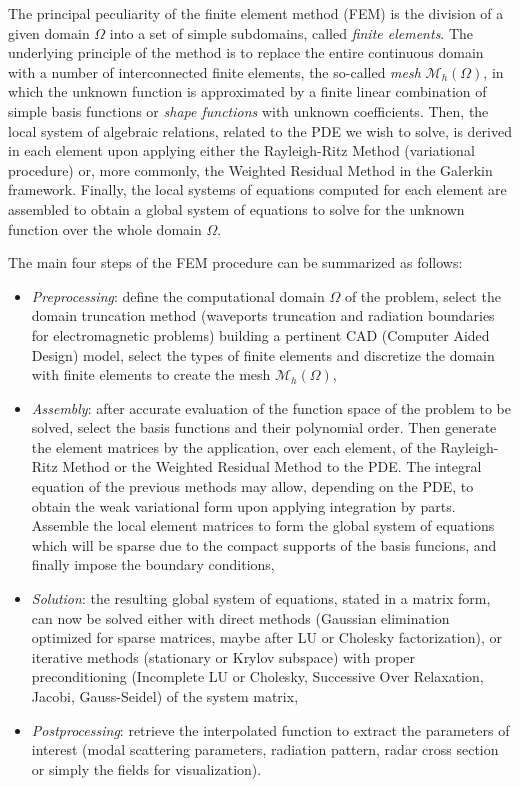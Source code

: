 The principal peculiarity of the finite element method (FEM) is the division of a given domain $\Omega$ into a set of simple subdomains, called \textit{finite elements}. The underlying principle of the method is to replace the entire continuous domain with a number of interconnected finite elements, the so-called \textit{mesh} $\mathcal{M}_h(\Omega)$, in which the unknown function is approximated by a finite linear combination of simple basis functions or \textit{shape functions} with unknown coefficients. Then, the local system of algebraic relations, related to the PDE we wish to solve, is derived in each element upon applying either the Rayleigh-Ritz Method (variational procedure) or, more commonly, the Weighted Residual Method in the Galerkin framework. Finally, the local systems of equations computed for each element are assembled to obtain a global system of equations to solve for the unknown function over the whole domain $\Omega$. 

The main four steps of the FEM procedure can be summarized as follows:
\begin{itemize}
\setlength{\itemsep}{0pt}
\item \textit{Preprocessing}: define the computational domain $\Omega$ of the problem, select the domain truncation method (waveports truncation and radiation boundaries for electromagnetic problems) building a pertinent CAD (Computer Aided Design) model, select the types of finite elements and discretize the domain with finite elements to create the mesh $\mathcal{M}_h(\Omega)$,
\item \textit{Assembly}: after accurate evaluation of the function space of the problem to be solved, select the basis functions and their polynomial order. Then generate the element matrices by the application, over each element, of the Rayleigh-Ritz Method or the Weighted Residual Method to the PDE. The integral equation of the previous methods may allow, depending on the PDE, to obtain the weak variational form upon applying integration by parts. Assemble the local element matrices to form the global system of equations which will be sparse due to the compact supports of the basis funcions, and finally impose the boundary conditions,
\item \textit{Solution}: the resulting global system of equations, stated in a matrix form, can now be solved either with direct methods (Gaussian elimination optimized for sparse matrices, maybe after LU or Cholesky factorization), or iterative methods (stationary or Krylov subspace) with proper preconditioning (Incomplete LU or Cholesky, Successive Over Relaxation, Jacobi, Gauss-Seidel) of the system matrix,
\item \textit{Postprocessing}: retrieve the interpolated function to extract the parameters of interest (modal scattering parameters, radiation pattern, radar cross section or simply the fields for visualization).
\end{itemize}

